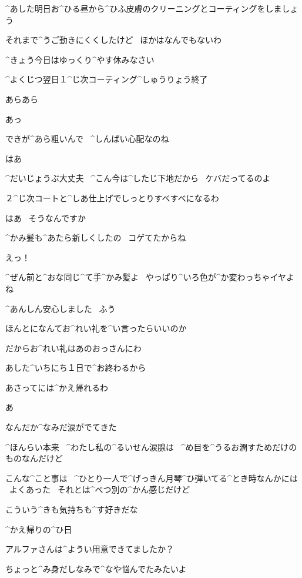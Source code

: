 \Sensei ^{あした}{明日}お^{ひる}{昼}から^{ひふ}{皮膚}のクリーニングとコーティングをしましょう

\Sensei それまで^{うご}{動}きにくくしたけど
\ ほかはなんでもないわ

\Sensei ^{きょう}{今日}はゆっくり^{やす}{休}みなさい

\page[92]
\Narrator ^{よくじつ}{翌日}１^{じ}{次}コーティング^{しゅうりょう}{終了}

\Sensei あらあら

\Alpha あっ

\Sensei できが^{あら}{粗}いんで
\ ^{しんぱい}{心配}なのね

\Alpha はあ

\Sensei ^{だいじょうぶ}{大丈夫}
\ ^{こん}{今}は^{したじ}{下地}だから
\ ケバだってるのよ

\page[93]
\Sensei ２^{じ}{次}コートと^{しあ}{仕上}げでしっとりすべすべになるわ

\Alpha はあ
\ そうなんですか

\Sensei ^{かみ}{髪}も^{あたら}{新}しくしたの
\ コゲてたからね

\Alpha えっ！

\Sensei ^{ぜん}{前}と^{おな}{同}じ^{て}{手}^{かみ}{髪}よ
\ やっぱり^{いろ}{色}が^{か}{変}わっちゃイヤよね

\Alpha ^{あんしん}{安心}しました
\ ふう

\Alpha ほんとになんてお^{れい}{礼}を^{い}{言}ったらいいのか

\Sensei だからお^{れい}{礼}はあのおっさんにわ

\Sensei あした^{いちにち}{１日}で^{お}{終}わるから

\Sensei あさってには^{かえ}{帰}れるわ

\page[94]
\Alpha あ

\Alpha なんだか^{なみだ}{涙}がでてきた

\Alpha ^{ほんらい}{本来}
\ ^{わたし}{私}の^{るいせん}{涙腺}は
\ ^{め}{目}を^{うるお}{潤}すためだけのものなんだけど

\Alpha こんな^{こと}{事}は
\ ^{ひとり}{一人}で^{げっきん}{月琴}^{ひ}{弾}いてる^{とき}{時}なんかには
\ よくあった
\ それとは^{べつ}{別}の^{かん}{感}じだけど

\Alpha こういう^{きも}{気持}ちも^{す}{好}きだな

\page[95]
\Narrator ^{かえ}{帰}りの^{ひ}{日}

\Ojisan アルファさんは^{ようい}{用意}できてましたか？

\Sensei ちょっと^{み}{身}だしなみで^{なや}{悩}んでたみたいよ

